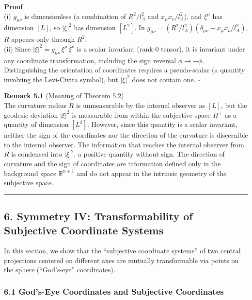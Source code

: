 \documentclass[a4paper,11pt]{article}
\theoremstyle{definition}
\begin{document}
\textbf{Proof}\\
(i) \(g_{\mu\nu}\) is dimensionless (a combination of \(R^2/l_A^2\) and \(x_\mu x_\nu/l_A^2\)), and \(\xi^\mu\) has dimension \([L]\), so \(|\xi|^2\) has dimension \([L^2]\). In \(g_{\mu\nu} = (R^2/l_A^2)(\delta_{\mu\nu} - x_\mu x_\nu/l_A^2)\), \(R\) appears only through \(R^2\).\\
(ii) Since \(|\xi|^2 = g_{\mu\nu}\,\xi^\mu\,\xi^\nu\) is a scalar invariant (rank-0 tensor), it is invariant under any coordinate transformation, including the sign reversal \(\phi \to -\phi\). Distinguishing the orientation of coordinates requires a pseudo-scalar (a quantity involving the Levi-Civita symbol), but \(|\xi|^2\) does not contain one. \(\square\)

\textbf{Remark 5.1} (Meaning of Theorem 5.2)\\
The curvature radius \(R\) is unmeasurable by the internal observer as \([L]\), but the geodesic deviation \(|\xi|^2\) is measurable from within the subjective space \(H^+\) as a quantity of dimension \([L^2]\). However, since this quantity is a scalar invariant, neither the sign of the coordinates nor the direction of the curvature is discernible to the internal observer. The information that reaches the internal observer from \(R\) is condensed into \(|\xi|^2\), a positive quantity without sign. The direction of curvature and the sign of coordinates are information defined only in the background space \(\mathbb{R}^{n+1}\) and do not appear in the intrinsic geometry of the subjective space.

\begin{center}\rule{0.5\linewidth}{0.5pt}\end{center}

\subsection{6. Symmetry IV: Transformability of Subjective Coordinate Systems}\label{symmetry-iv-transformability-of-subjective-coordinate-systems}

In this section, we show that the ``subjective coordinate systems'' of two central projections centered on different axes are mutually transformable via points on the sphere (``God's-eye'' coordinates).

\subsubsection{6.1 God's-Eye Coordinates and Subjective Coordinates}\label{gods-eye-coordinates-and-subjective-coordinates}
\end{document}
